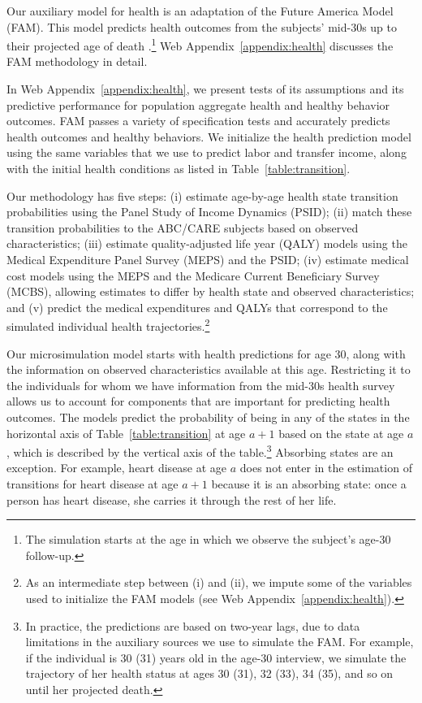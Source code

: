 Our auxiliary model for health is an adaptation of the Future America Model (FAM). This model predicts health outcomes from the subjects' mid-30s up to their projected age of death \citep{Goldman_etal_2015_Future-Elderly-Model-Report}.\footnote{The simulation starts at the age in which we observe the subject's age-30 follow-up.} Web Appendix~\ref{appendix:health} discusses the FAM methodology in detail.

In Web Appendix~\ref{appendix:health}, we present tests of its assumptions and its predictive performance for population aggregate health and healthy behavior outcomes. FAM passes a variety of specification tests and accurately predicts health outcomes and healthy behaviors. We initialize the health prediction model using the same variables that we use to predict labor and transfer income, along with the initial health conditions as listed in Table~\ref{table:transition}.

Our methodology has five steps: (i) estimate age-by-age health state transition probabilities using the Panel Study of Income Dynamics (PSID); (ii) match these transition probabilities to the ABC/CARE subjects based on observed characteristics; (iii) estimate quality-adjusted life year (QALY) models using the Medical Expenditure Panel Survey (MEPS) and the PSID; (iv) estimate medical cost models using the MEPS and the Medicare Current Beneficiary Survey (MCBS), allowing estimates to differ by health state and observed characteristics; and (v) predict the medical expenditures and QALYs that correspond to the simulated individual health trajectories.\footnote{As an intermediate step between (i) and (ii), we impute some of the variables used to initialize the FAM models (see Web Appendix~\ref{appendix:health}).}

Our microsimulation model starts with health predictions for age 30, along with the information on observed characteristics available at this age. Restricting it to the individuals for whom we have information from the mid-30s health survey allows us to account for components that are important for predicting health outcomes. The models predict the probability of being in any of the states in the horizontal axis of Table~\ref{table:transition} at age $a+1$ based on the state at age $a$, which is described by the vertical axis of the table.\footnote{In practice, the predictions are based on two-year lags, due to data limitations in the auxiliary sources we use to simulate the FAM. For example, if the individual is 30 (31) years old in the age-30 interview, we simulate the trajectory of her health status at ages 30 (31), 32 (33), 34 (35), and so on until her projected death.} Absorbing states are an exception. For example, heart disease at age $a$ does not enter in the estimation of transitions for heart disease at age $a+1$ because it is an absorbing state: once a person has heart disease, she carries it through the rest of her life.

